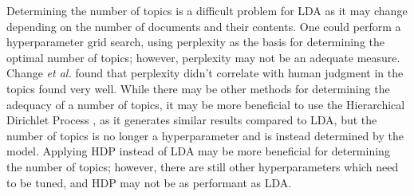 Determining the number of topics is a difficult problem for LDA as it may change depending on the number of documents and their contents. One could perform a hyperparameter grid search, using perplexity as the basis for determining the optimal number of topics; however, perplexity may not be an adequate measure. Change \textit{et al.} \cite{chang2009reading} found that perplexity didn't correlate with human judgment in the topics found very well. While there may be other methods for determining the adequacy of a number of topics, it may be more beneficial to use the Hierarchical Dirichlet Process \cite{teh2005sharing}, as it generates similar results compared to LDA, but the number of topics is no longer a hyperparameter and is instead determined by the model. Applying HDP instead of LDA may be more beneficial for determining the number of topics; however, there are still other hyperparameters which need to be tuned, and HDP may not be as performant as LDA.